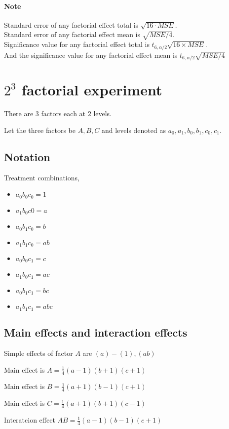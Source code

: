 \documentclass[oneside,11pt,pdftex]{book}%
\numberwithin{equation}{section}
\numberwithin{section}{chapter}
\numberwithin{equation}{chapter}
\begin{document}
\paragraph{Note}
Standard error of any factorial effect total is $ \sqrt{16\cdot MSE} $.\\
Standard error of any factorial effect mean is $\sqrt{MSE/4}$.\\
Significance value for any factorial effect total is $ t_{6,\alpha/2}\sqrt{16 \times MSE} $.\\
And the significance value for any factorial effect mean is $ t_{6,\alpha/2}\sqrt{MSE/4} $

\section{$ 2^3 $ factorial experiment}
There are $ 3 $ factors each at $ 2 $ levels.

Let the three factors be $ A,B,C $ and levels denoted as $ a_0,a_1,b_0,b_1,c_0,c_1 $.

\subsection{Notation}
Treatment combinations,
\begin{itemize}
	\item $ a_0b_0c_0=1 $
	\item $ a_1b_0c0=a $
	\item $ a_0b_1c_0=b $
	\item $ a_1b_1c_0=ab $
	\item $ a_0b_0c_1=c $
	\item $ a_1b_0c_1=ac $
	\item $ a_0b_1c_1=bc $
	\item $ a_1b_1c_1=abc $
\end{itemize}

\subsection{Main effects and interaction effects}
Simple effects of factor $ A $ are $ (a)-(1),(ab) $

Main effect is $ A=\frac{1}{4}(a-1)(b+1)(c+1) $

Main effect is $ B=\frac{1}{4}(a+1)(b-1)(c+1) $


Main effect is $ C=\frac{1}{4}(a+1)(b+1)(c-1) $


Interatcion effect 
$ AB=\frac{1}{4}(a-1)(b-1)(c+1) $
\end{document}
